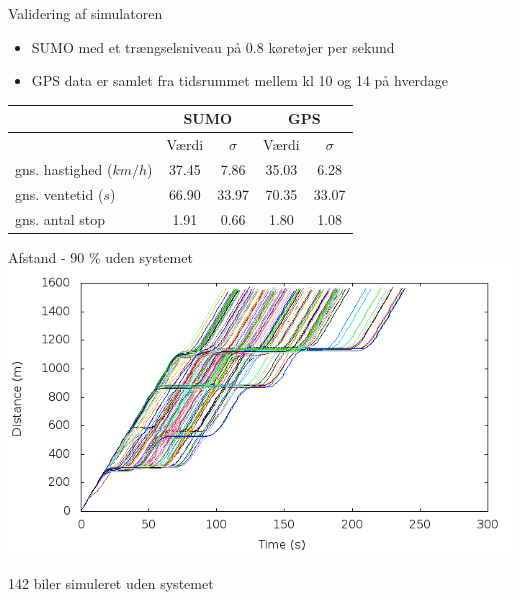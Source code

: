 \begin{frame}{Validering af simulatoren}

\begin{itemize}

\item SUMO med et trængselsniveau på 0.8 køretøjer per sekund
\item GPS data er samlet fra tidsrummet mellem kl 10 og 14 på hverdage
\end{itemize}

\centering
	\begin{tabular}{|l|c|c|c|c|}\hline
	 						&  \multicolumn{2}{c|}{SUMO} & \multicolumn{2}{c|}{GPS} \\\hline
	 						& Værdi & $\sigma$ & Værdi & $\sigma$ \\\hline
	gns. hastighed ($km/h$) 	& 37.45 & 7.86 	& 35.03 & 6.28 \\\hline
	gns. ventetid ($s$) & 66.90 & 33.97 & 70.35 & 33.07 \\\hline
	gns. antal stop 	& 1.91 	& 0.66 	& 1.80 	& 1.08 \\\hline
	\end{tabular}

\end{frame}

\begin{frame}{Afstand - 90 \% uden systemet}
\includegraphics[width=1\textwidth]{../images/tp0c0_8/distanceUncontrolled10.png}

142 biler simuleret uden systemet
\end{frame}

